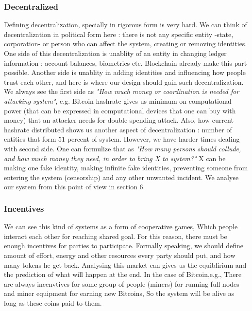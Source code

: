 \documentclass{article}
\begin{document}
\subsubsection{Decentralized}

Defining decentralization, specially in rigorous form is very hard. We can think of decentralization in political form here : there is not any specific entity -state, corporation- or person who can affect the system, creating or removing identities. One side of this decentralization is unablity of an entity in changing ledger information : account balances, biometrics etc. Blockchain already make this part possible. Another side is unablity in adding identities and influencing how people trust each other, and here is where our design should gain such decentralization.
\\
We always see the first side as \textit{"How much money or coordination is needed for attacking system"}, e.g. Bitcoin hashrate gives us minimum on computational power (that can be expressed in computational devices that one can buy with money) that an attacker needs for double spending attack. Also, how current hashrate distributed shows us another aspect of decentralization : number of entities that form 51 percent of system. However, we have harder times dealing with second side. One can formulize that as \textit{"How many persons should collude, and how much money they need, in order to bring X to system?"} X can be making one fake identity, making infinite fake identities, preventing someone from entering the system (censorship) and any other unwanted incident. We analyse our system from this point of view in section 6. 


\subsubsection{Incentives}
We can see this kind of systems as a form of cooperative games, Which people interact each other for reaching shared goal. For this reason, there must be enough incentives for parties to participate. Formally speaking, we should define amount of effort, energy and other resources every party should put, and how many tokens he get back. Analysing this market can gives us the equiblirium and the prediction of what will happen at the end. In the case of Bitcoin,e.g., There are always incenvtives for some group of people (miners) for running full nodes and miner equipment for earning new Bitcoins, So the system will be alive as long as these coins paid to them.
\end{document}
